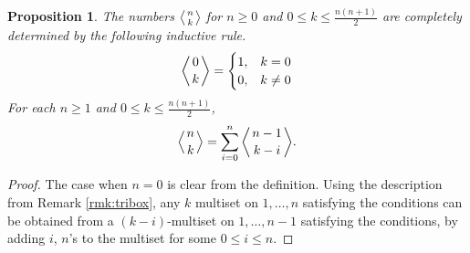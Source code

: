 \documentclass{article}
\theoremstyle{plain}
\newtheorem{prop}[thm]{Proposition}
\theoremstyle{definition}
\numberwithin{thm}{section}
\begin{document}
			\begin{prop}\label{triinduct}
				The numbers ${\ensuremath{\left \langle \genfrac{}{}{0pt}{}{{n}}{{k}}\right \rangle}}$ for $n\geq 0$ and $0\leq k \leq \frac{n(n+1)}{2}$ are completely determined by the following inductive rule.
				\begin{equation*}
					{\ensuremath{\left \langle \genfrac{}{}{0pt}{}{{0}}{{k}}\right \rangle}}=
					\begin{cases}
						1, & k=0\\
						0, & k\neq 0
					\end{cases}
				\end{equation*}
				For each $n\geq 1$ and $0\leq k \leq \frac{n(n+1)}{2}$,
				\begin{equation*}
					{\ensuremath{\left \langle \genfrac{}{}{0pt}{}{{n}}{{k}}\right \rangle}}=\sum_{i=0}^{n}{\ensuremath{\left \langle \genfrac{}{}{0pt}{}{{n-1}}{{k-i}}\right \rangle}}.
				\end{equation*}
			\end{prop}
			\begin{proof}
				The case when $n=0$ is clear from the definition.
				Using the description from Remark \ref{rmk:tribox}, any $k$ multiset on $1,\dots,n$ satisfying the conditions
				can be obtained from a $(k-i)$-multiset on $1,\dots,n-1$ satisfying the conditions, by adding $i$, $n$'s to the multiset
				for some $0\leq i \leq n$.
			\end{proof}
			
			
			
\end{document}

